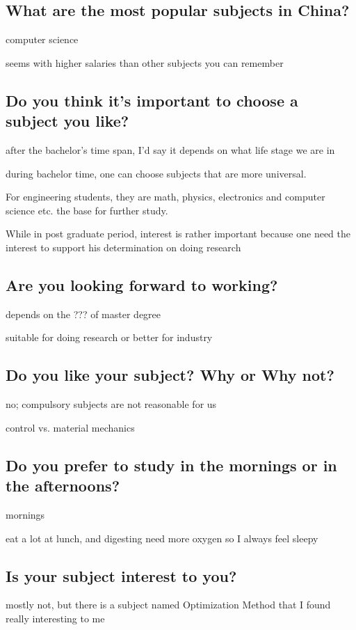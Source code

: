 \documentclass[conference]{IEEEtran}
\begin{document}
\subsection{What are the most popular subjects in China?}
computer science

seems with higher salaries than other subjects you can remember

\subsection{Do you think it's important to choose a subject you like?}
after the bachelor's time span, I'd say it depends on what life stage we are in

during bachelor time, one can choose subjects that are more universal.

For engineering students, they are math, physics, electronics and computer science etc.
the base for further study.

While in post graduate period, interest is rather important because
one need the interest to support his determination on doing research

\subsection{Are you looking forward to working?}
depends on the ??? of master degree

suitable for doing research or better for industry

\subsection{Do you like your subject? Why or Why not?}
no; compulsory subjects are not reasonable for us 

control vs. material mechanics

\subsection{Do you prefer to study in the mornings or in the afternoons?}
mornings

eat a lot at lunch, and digesting need more oxygen so I always feel sleepy

\subsection{Is your subject interest to you?}
mostly not, but there is a subject named Optimization Method that I found really interesting to me
\end{document}
